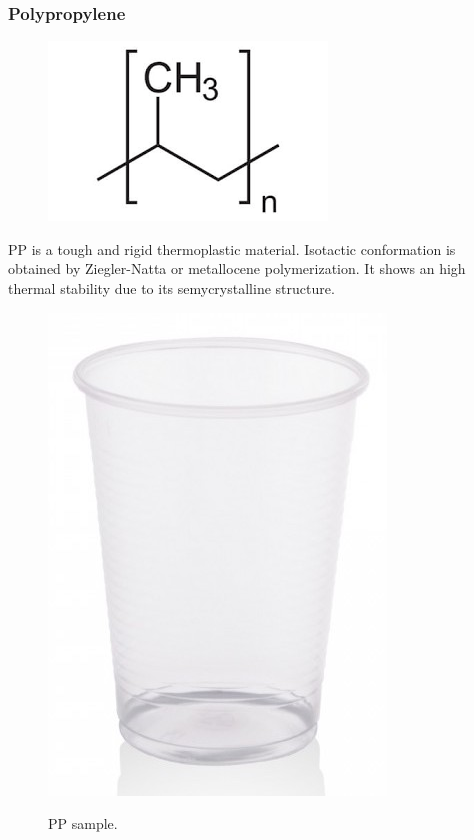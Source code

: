 \documentclass[a4paper, 11pt]{article}
\begin{document}
\subsubsection{Polypropylene}

\begin{figure}[htp]
	\centering
	{\includegraphics[scale=0.32]{pp_chem}}
	\captionsetup{justification=centering}
	\label{fig:PE}
\end{figure}
PP is a tough and rigid thermoplastic material. Isotactic conformation is obtained by Ziegler-Natta or metallocene polymerization. It shows an high thermal stability due to its semycrystalline structure.

\begin{figure}[h!]
	\centering
	{\includegraphics[scale=0.18]{PP}}
	\captionsetup{justification=centering}
	\caption{PP sample.}
	\label{fig:PP}
\end{figure}
\end{document}

